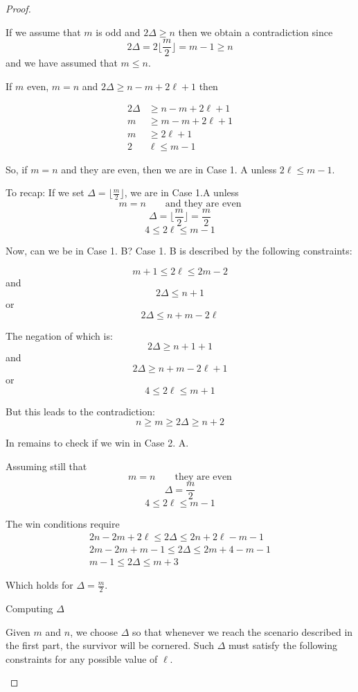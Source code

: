 \begin{proof}
\begin{description}
If we assume that $m$ is odd and $ 2 \Delta \geq n$ then we obtain a
contradiction since
\[ 2 \Delta = 2 \lfloor \frac{m}{2} \rfloor = m -1 \geq n \]
and we have assumed that $m \leq n$.

If $m$ even, $m = n$ and $2\Delta \geq n - m + 2\ell +1$ then

\begin{align*}
  2 \Delta & \geq n - m + 2\ell + 1 \\
  m & \geq m - m + 2 \ell + 1 \\
  m & \geq 2 \ell + 1 \\
  2 & \ell \leq m -1
\end{align*}

So, if $m = n$ and they are even, then we are in Case 1. A unless $2 \ell \leq m -1$.

To recap: If we set $\Delta = \lfloor \frac{m}{2} \rfloor$, we are in Case 1.A unless
\[ m = n \qquad \text{and they are even} \]
\[ \Delta = \lfloor \frac{m}{2} \rfloor = \frac{m}{2} \]
\[ 4 \leq 2 \ell \leq m -1 \]

Now, can we be in Case 1. B? Case 1. B is described by the following constraints:

\[ m+1 \leq 2 \ell \leq 2m -2 \]
and
\[2 \Delta \leq n +1 \]
or
\[2\Delta \leq n + m - 2 \ell \]

The negation of which is:
\[2 \Delta \geq n +1 +1 \]
and
\[2\Delta \geq n + m - 2 \ell + 1\]
or
\[4 \leq 2 \ell \leq m +1 \]

But this leads to the contradiction:
\[ n \geq m \geq 2 \Delta \geq n +2 \]

In remains to check if we win in Case 2. A.

Assuming still that
\[ m = n \qquad \text{they are even} \]
\[ \Delta = \frac{m}{2} \]
\[ 4 \leq 2 \ell \leq m -1 \]

The win conditions require
\begin{align*}
2n - 2m + 2\ell \leq 2 \Delta \leq 2n + 2\ell -m -1 \\
2m - 2m + m - 1 \leq 2 \Delta \leq 2m + 4 - m - 1 \\
m - 1 \leq 2 \Delta \leq m + 3
\end{align*}

Which holds for $\Delta = \frac{m}{2}$.

\item Computing $\Delta$ \label{thm q_m_n 3}

 Given $m$ and $n$, we choose $\Delta$ so that whenever we reach
 the scenario described in the first part, the survivor will be cornered.
 Such $\Delta$ must satisfy the following constraints for any possible
 value of $\ell$.


\end{description}
\end{proof}
